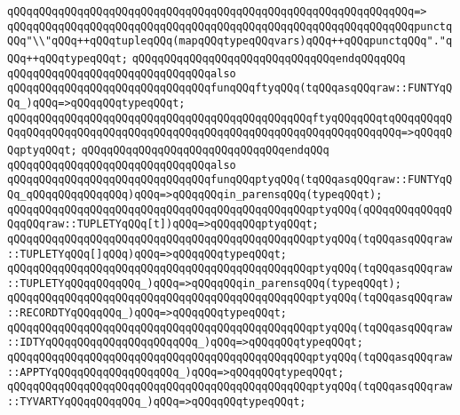 \verb|qQQqqQQqqQQqqQQqqQQqqQQqqQQqqQQqqQQqqQQqqQQqqQQqqQQqqQQqqQQqqQQq=>|\newline
\verb|qQQqqQQqqQQqqQQqqQQqqQQqqQQqqQQqqQQqqQQqqQQqqQQqqQQqqQQqqQQqqQQqpunctqQQq"\\"qQQq++qQQqtupleqQQq(mapqQQqtypeqQQqvars)qQQq++qQQqpunctqQQq"."qQQq++qQQqtypeqQQqt;|\newline
\verb|qQQqqQQqqQQqqQQqqQQqqQQqqQQqqQQqendqQQqqQQq|\newline
\newline
\verb|qQQqqQQqqQQqqQQqqQQqqQQqqQQqqQQqalso|\newline
\verb|qQQqqQQqqQQqqQQqqQQqqQQqqQQqqQQqfunqQQqftyqQQq(tqQQqasqQQqraw::FUNTYqQQq_)qQQq=>qQQqqQQqtypeqQQqt;|\newline
\verb|qQQqqQQqqQQqqQQqqQQqqQQqqQQqqQQqqQQqqQQqqQQqqQQqftyqQQqqQQqtqQQqqQQqqQQqqQQqqQQqqQQqqQQqqQQqqQQqqQQqqQQqqQQqqQQqqQQqqQQqqQQqqQQqqQQq=>qQQqqQQqptyqQQqt;|\newline
\verb|qQQqqQQqqQQqqQQqqQQqqQQqqQQqqQQqendqQQq|\newline
\newline
\verb|qQQqqQQqqQQqqQQqqQQqqQQqqQQqqQQqalso|\newline
\verb|qQQqqQQqqQQqqQQqqQQqqQQqqQQqqQQqfunqQQqptyqQQq(tqQQqasqQQqraw::FUNTYqQQq_qQQqqQQqqQQqqQQq)qQQq=>qQQqqQQqin_parensqQQq(typeqQQqt);|\newline
\verb|qQQqqQQqqQQqqQQqqQQqqQQqqQQqqQQqqQQqqQQqqQQqqQQqptyqQQq(qQQqqQQqqQQqqQQqqQQqraw::TUPLETYqQQq[t])qQQq=>qQQqqQQqptyqQQqt;|\newline
\verb|qQQqqQQqqQQqqQQqqQQqqQQqqQQqqQQqqQQqqQQqqQQqqQQqptyqQQq(tqQQqasqQQqraw::TUPLETYqQQq[]qQQq)qQQq=>qQQqqQQqtypeqQQqt;|\newline
\verb|qQQqqQQqqQQqqQQqqQQqqQQqqQQqqQQqqQQqqQQqqQQqqQQqptyqQQq(tqQQqasqQQqraw::TUPLETYqQQqqQQqqQQq_)qQQq=>qQQqqQQqin_parensqQQq(typeqQQqt);|\newline
\verb|qQQqqQQqqQQqqQQqqQQqqQQqqQQqqQQqqQQqqQQqqQQqqQQqptyqQQq(tqQQqasqQQqraw::RECORDTYqQQqqQQq_)qQQq=>qQQqqQQqtypeqQQqt;|\newline
\verb|qQQqqQQqqQQqqQQqqQQqqQQqqQQqqQQqqQQqqQQqqQQqqQQqptyqQQq(tqQQqasqQQqraw::IDTYqQQqqQQqqQQqqQQqqQQqqQQq_)qQQq=>qQQqqQQqtypeqQQqt;|\newline
\verb|qQQqqQQqqQQqqQQqqQQqqQQqqQQqqQQqqQQqqQQqqQQqqQQqptyqQQq(tqQQqasqQQqraw::APPTYqQQqqQQqqQQqqQQqqQQq_)qQQq=>qQQqqQQqtypeqQQqt;|\newline
\verb|qQQqqQQqqQQqqQQqqQQqqQQqqQQqqQQqqQQqqQQqqQQqqQQqptyqQQq(tqQQqasqQQqraw::TYVARTYqQQqqQQqqQQq_)qQQq=>qQQqqQQqtypeqQQqt;|\newline
